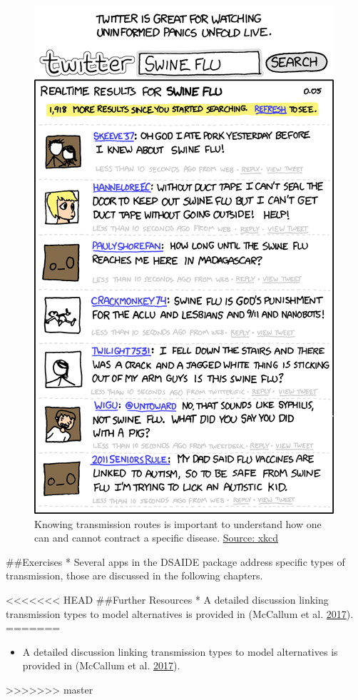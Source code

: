 \documentclass[]{book}
\providecommand{\tightlist}{%
  \setlength{\itemsep}{0pt}\setlength{\parskip}{0pt}}
\theoremstyle{definition}
\theoremstyle{definition}
\theoremstyle{definition}
\theoremstyle{remark}
\begin{document}
\begin{figure}
\centering
\includegraphics{./images/xkcd-swine_flu.png}
\caption{Knowing transmission routes is important to understand how one
can and cannot contract a specific disease.
\href{https://xkcd.com/574/}{Source: xkcd}}
\end{figure}

\#\#Exercises * Several apps in the DSAIDE package address specific
types of transmission, those are discussed in the following chapters.

<<<<<<< HEAD
\#\#Further Resources * A detailed discussion linking transmission types
to model alternatives is provided in (McCallum et al.
\protect\hyperlink{ref-mccallum17}{2017}).
=======
\begin{itemize}
\tightlist
\item
  A detailed discussion linking transmission types to model alternatives
  is provided in (McCallum et al.
  \protect\hyperlink{ref-mccallum17}{2017}).
\end{itemize}
>>>>>>> master
\end{document}
